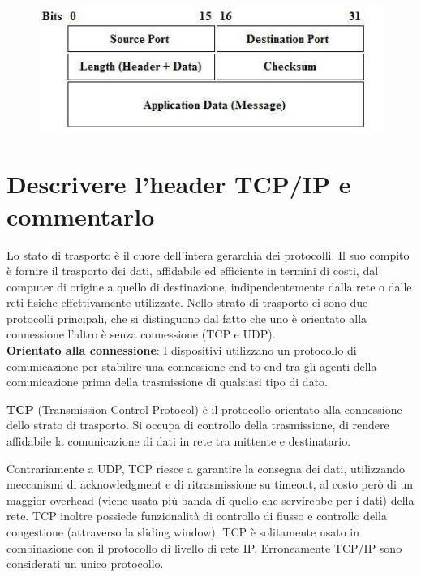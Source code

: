 \begin{figure}[H]
\centering
\includegraphics[scale=0.6]{res/img/48_HeaderUDP.png}
\end{figure}
 
\section{Descrivere l’header TCP/IP e commentarlo}
Lo stato di trasporto è il cuore dell’intera gerarchia dei protocolli. Il suo compito è fornire il trasporto dei dati, affidabile ed efficiente in termini di costi, dal computer di origine a quello di destinazione, indipendentemente dalla rete o dalle reti fisiche effettivamente utilizzate.
Nello strato di trasporto ci sono due protocolli principali, che si distinguono dal fatto che uno è orientato alla connessione l’altro è senza connessione (TCP e UDP).\\
\textbf{Orientato alla connessione}: I dispositivi utilizzano un protocollo di comunicazione per stabilire una connessione end-to-end tra gli agenti della comunicazione prima della trasmissione di qualsiasi tipo di dato.

\textbf{TCP} (Transmission Control Protocol) è il protocollo orientato alla connessione dello strato di trasporto. Si occupa di controllo della trasmissione, di rendere affidabile la comunicazione di dati in rete tra mittente e destinatario.

Contrariamente a UDP, TCP riesce a garantire la consegna dei dati, utilizzando meccanismi di acknowledgment e di ritrasmissione su timeout, al costo però di un maggior overhead (viene usata più banda di quello che servirebbe per i dati) della rete.
TCP inoltre possiede funzionalità di controllo di flusso e controllo della congestione (attraverso la sliding window).
TCP è solitamente usato in combinazione con il protocollo di livello di rete IP. Erroneamente TCP/IP sono considerati un unico protocollo.

